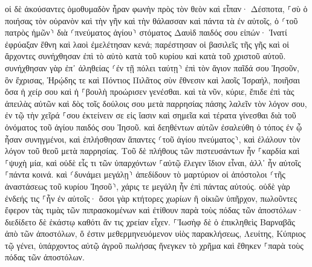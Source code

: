 \documentclass[twoside, 9pt]{extreport}
\begin{document}
οἱ δὲ ἀκούσαντες ὁμοθυμαδὸν ἦραν φωνὴν πρὸς τὸν θεὸν καὶ εἶπαν· Δέσποτα, ⸀σὺ ὁ ποιήσας τὸν οὐρανὸν καὶ τὴν γῆν καὶ τὴν θάλασσαν καὶ πάντα τὰ ἐν αὐτοῖς, 
ὁ ⸂τοῦ πατρὸς ἡμῶν⸃ διὰ ⸂πνεύματος ἁγίου⸃ στόματος Δαυὶδ παιδός σου εἰπών· Ἱνατί ἐφρύαξαν ἔθνη καὶ λαοὶ ἐμελέτησαν κενά; 
παρέστησαν οἱ βασιλεῖς τῆς γῆς καὶ οἱ ἄρχοντες συνήχθησαν ἐπὶ τὸ αὐτὸ κατὰ τοῦ κυρίου καὶ κατὰ τοῦ χριστοῦ αὐτοῦ. 
συνήχθησαν γὰρ ἐπ᾽ ἀληθείας ⸂ἐν τῇ πόλει ταύτῃ⸃ ἐπὶ τὸν ἅγιον παῖδά σου Ἰησοῦν, ὃν ἔχρισας, Ἡρῴδης τε καὶ Πόντιος Πιλᾶτος σὺν ἔθνεσιν καὶ λαοῖς Ἰσραήλ, 
ποιῆσαι ὅσα ἡ χείρ σου καὶ ἡ ⸀βουλὴ προώρισεν γενέσθαι. 
καὶ τὰ νῦν, κύριε, ἔπιδε ἐπὶ τὰς ἀπειλὰς αὐτῶν καὶ δὸς τοῖς δούλοις σου μετὰ παρρησίας πάσης λαλεῖν τὸν λόγον σου, 
ἐν τῷ τὴν χεῖρά ⸀σου ἐκτείνειν σε εἰς ἴασιν καὶ σημεῖα καὶ τέρατα γίνεσθαι διὰ τοῦ ὀνόματος τοῦ ἁγίου παιδός σου Ἰησοῦ. 
καὶ δεηθέντων αὐτῶν ἐσαλεύθη ὁ τόπος ἐν ᾧ ἦσαν συνηγμένοι, καὶ ἐπλήσθησαν ἅπαντες ⸂τοῦ ἁγίου πνεύματος⸃, καὶ ἐλάλουν τὸν λόγον τοῦ θεοῦ μετὰ παρρησίας. 
Τοῦ δὲ πλήθους τῶν πιστευσάντων ἦν ⸀καρδία καὶ ⸀ψυχὴ μία, καὶ οὐδὲ εἷς τι τῶν ὑπαρχόντων ⸀αὐτῷ ἔλεγεν ἴδιον εἶναι, ἀλλ᾽ ἦν αὐτοῖς ⸀πάντα κοινά. 
καὶ ⸂δυνάμει μεγάλῃ⸃ ἀπεδίδουν τὸ μαρτύριον οἱ ἀπόστολοι ⸂τῆς ἀναστάσεως τοῦ κυρίου Ἰησοῦ⸃, χάρις τε μεγάλη ἦν ἐπὶ πάντας αὐτούς. 
οὐδὲ γὰρ ἐνδεής τις ⸀ἦν ἐν αὐτοῖς· ὅσοι γὰρ κτήτορες χωρίων ἢ οἰκιῶν ὑπῆρχον, πωλοῦντες ἔφερον τὰς τιμὰς τῶν πιπρασκομένων 
καὶ ἐτίθουν παρὰ τοὺς πόδας τῶν ἀποστόλων· διεδίδετο δὲ ἑκάστῳ καθότι ἄν τις χρείαν εἶχεν. 
⸀Ἰωσὴφ δὲ ὁ ἐπικληθεὶς Βαρναβᾶς ἀπὸ τῶν ἀποστόλων, ὅ ἐστιν μεθερμηνευόμενον υἱὸς παρακλήσεως, Λευίτης, Κύπριος τῷ γένει, 
ὑπάρχοντος αὐτῷ ἀγροῦ πωλήσας ἤνεγκεν τὸ χρῆμα καὶ ἔθηκεν ⸀παρὰ τοὺς πόδας τῶν ἀποστόλων. 
\end{document}
